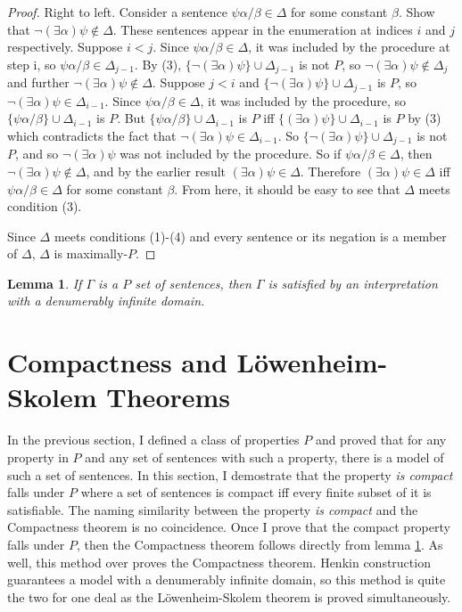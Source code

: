 \documentclass[12pt]{article}
\newtheorem{lemma}[theorem]{Lemma}
\theoremstyle{definition}
\theoremstyle{remark}
\begin{document}
\begin{proof}
	Right to left. Consider a sentence $\psi\alpha/\beta \in \Delta$ for some constant $\beta$. Show that $\neg(\exists \alpha)\psi \not\in \Delta$. These sentences appear in the enumeration at indices $i$ and $j$ respectively. Suppose $i < j$. Since $\psi\alpha/\beta \in \Delta$, it was included by the procedure at step i, so $\psi\alpha/\beta \in \Delta_{j-1}$. By (3), $\{ \neg(\exists \alpha)\psi \} \cup \Delta_{j-1}$ is not $P$, so $\neg(\exists \alpha)\psi \not\in \Delta_j$ and further $\neg(\exists \alpha)\psi \not\in \Delta$. Suppose $j<i$ and $\{ \neg(\exists \alpha)\psi \} \cup \Delta_{j-1}$ is $P$, so $\neg(\exists \alpha)\psi \in \Delta_{i-1}$. Since $\psi\alpha/\beta \in \Delta$, it was included by the procedure, so $\{ \psi\alpha/\beta \} \cup \Delta_{i-1}$ is $P$. But $\{ \psi\alpha/\beta \} \cup \Delta_{i-1}$ is $P$ iff $\{ (\exists \alpha)\psi \} \cup \Delta_{i-1}$ is $P$ by (3) which contradicts the fact that $\neg(\exists \alpha)\psi \in \Delta_{i-1}$. So $\{ \neg(\exists \alpha)\psi \} \cup \Delta_{j-1}$ is not $P$, and so $\neg(\exists \alpha)\psi$ was not included by the procedure. So if $\psi\alpha/\beta \in \Delta$, then $\neg(\exists \alpha)\psi \not\in \Delta$, and by the earlier result $(\exists \alpha)\psi \in \Delta$. Therefore $(\exists \alpha)\psi \in \Delta$ iff $\psi\alpha/\beta \in \Delta$ for some constant $\beta$. From here, it should be easy to see that $\Delta$ meets condition (3).
	
	Since $\Delta$ meets conditions (1)-(4) and every sentence or its negation is a member of $\Delta$, $\Delta$ is maximally-$P$.
\end{proof}

\begin{lemma}
	\label{lem:sat-p}
	If $\Gamma$ is a $P$ set of sentences, then $\Gamma$ is satisfied by an interpretation with a denumerably infinite domain.
\end{lemma}

\section{Compactness and L{\"o}wenheim-Skolem Theorems}

In the previous section, I defined a class of properties $P$ and proved that for any property in $P$ and any set of sentences with such a property, there is a model of such a set of sentences. In this section, I demostrate that the property \textit{is compact} falls under $P$ where a set of sentences is compact iff every finite subset of it is satisfiable. The naming similarity between the property \textit{is compact} and the Compactness theorem is no coincidence. Once I prove that the compact property falls under $P$, then the Compactness theorem follows directly from lemma \ref{lem:sat-p}. As well, this method over proves the Compactness theorem. Henkin construction guarantees a model with a denumerably infinite domain, so this method is quite the two for one deal as the L{\"o}wenheim-Skolem theorem is proved simultaneously.
\end{document}
